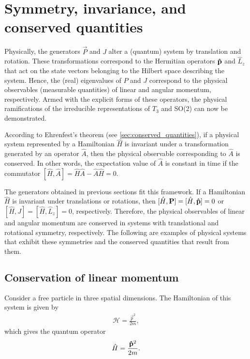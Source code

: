\section{Symmetry, invariance, and conserved quantities}\label{sec:PJ_physical}

Physically, the generators $\vec{P}$ and $J$ alter a (quantum) system by translation and rotation. These transformations correspond to the Hermitian operators $\mathbf{\hat{p}}$ and $\hat{L}_z$ that act on the state vectors belonging to the Hilbert space describing the system. Hence, the (real) eigenvalues of $P$ and $J$ correspond to the physical observables (measurable quantities) of linear and angular momentum, respectively. Armed with the explicit forms of these operators, the physical ramifications of the irreducible representations of $T_3$ and SO(2) can now be demonstrated.

According to Ehrenfest's theorem (see \cref{sec:conserved_quantities}), if a physical system represented by a Hamiltonian $\hat{H}$ is invariant under a transformation generated by an operator $\hat{A}$, then the physical observable corresponding to $\hat{A}$ is conserved. In other words, the expectation value of $\hat{A}$ is constant in time if the commutator $[\hat{H},\hat{A}] = \hat{H}\hat{A} - \hat{A}\hat{H} = 0$.

The generators obtained in previous sections fit this framework. If a Hamiltonian $\hat{H}$ is invariant under translations or rotations, then $[\hat{H}, \mathbf{P}] = [\hat{H},\mathbf{\hat{p}}] = 0$ or $[\hat{H}, J] = [\hat{H}, \hat{L}_z] = 0$, respectively. Therefore, the physical observables of linear and angular momentum are conserved in systems with translational and rotational symmetry, respectively. The following are examples of physical systems that exhibit these symmetries and the conserved quantities that result from them.

\subsection{Conservation of linear momentum}
Consider a free particle in three spatial dimensions. The Hamiltonian of this system is given by
\begin{align*}
    \mathcal{H} = \frac{\vec{p}^2}{2m},
\end{align*}
which gives the quantum operator
\begin{align*}
    \hat{H} = \frac{\mathbf{\hat{p}}^2}{2m}.
\end{align*}

